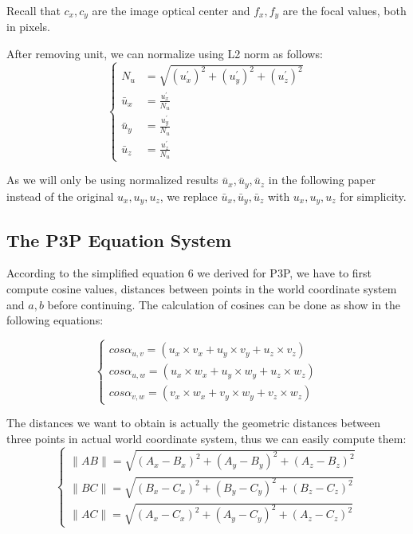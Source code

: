 \documentclass[conference]{IEEEtran}
\begin{document}
Recall that $c_x, c_y$ are the image optical center and $f_x, f_y$ are the focal values, both in pixels.

After removing unit, we can normalize using L2 norm as follows:
\begin{equation}
	\begin{cases}
		N_u &= \sqrt{(u_x^{\prime})^2 + (u_y^{\prime})^2 + (u_z^{\prime})^2}\\
		\bar{u}_x &= \frac{u_x^{\prime}}{N_u}\\
		\bar{u}_y &= \frac{u_y^{\prime}}{N_u}\\
		\bar{u}_z &= \frac{u_z^{\prime}}{N_u}
	\end{cases}
\end{equation}

As we will only be using normalized results $\bar{u}_x, \bar{u}_y, \bar{u}_z$ in the following paper instead of the original $u_x, u_y, u_z$, we replace $\bar{u}_x, \bar{u}_y, \bar{u}_z$ with $u_x, u_y, u_z$ for simplicity.

\subsection{The P3P Equation System}
According to the simplified equation 6 we derived for P3P, we have to first compute cosine values, distances between points in the world coordinate system and $a, b$ before continuing. The calculation of cosines can be done as show in the following equations:

\begin{equation}
	\begin{cases}
		cos\alpha _{u, v} = (u_x\times v_x + u_y \times v_y + u_z\times v_z)\\
		cos\alpha _{u, w} = (u_x\times w_x + u_y \times w_y + u_z\times w_z)\\
		cos\alpha _{v, w} = (v_x\times w_x + v_y\times w_y + v_z\times w_z)
	\end{cases}
\end{equation} 

The distances we want to obtain is actually the geometric distances between three points in actual world coordinate system, thus we can easily compute them:
\begin{equation}
	\begin{cases}
		\|AB\| = \sqrt{(A_x - B_x)^2 + (A_y - B_y)^2 + (A_z - B_z)^2}\\
		\|BC\| = \sqrt{(B_x - C_x)^2 + (B_y - C_y)^2 + (B_z - C_z)^2}\\
		\|AC\| = \sqrt{(A_x - C_x)^2 + (A_y - C_y)^2 + (A_z - C_z)^2}
	\end{cases}
\end{equation}
\end{document}
